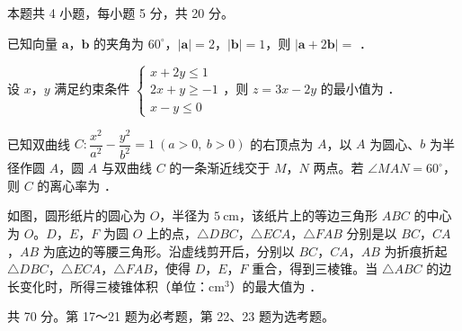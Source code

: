 \begin{gktip}
本题共 4 小题，每小题 5 分，共 20 分。
\end{gktip}

\begin{question}
已知向量 $\boldsymbol a$，$\boldsymbol b$ 的夹角为 $60^\circ$，$|\boldsymbol a|=2$，$|\boldsymbol b|=1$，则 $|\boldsymbol a+2\boldsymbol b|=$ \gkblank{}．

\end{question}
\begin{question}
设 $x$，$y$ 满足约束条件 $\begin{cases}x+2y\le1\\ 2x+y\ge-1\\ x-y\le0\end{cases}$，则 $z=3x-2y$ 的最小值为 \gkblank{}．

\end{question}
\begin{question}
已知双曲线 $C:\dfrac{x^{2}}{a^{2}}-\dfrac{y^{2}}{b^{2}}=1\ (a>0,\ b>0)$ 的右顶点为 $A$，以 $A$ 为圆心、$b$ 为半径作圆 $A$，圆 $A$ 与双曲线 $C$ 的一条渐近线交于 $M$，$N$ 两点。若 $\angle MAN=60^\circ$，则 $C$ 的离心率为 \gkblank{}．

\Needspace{0.4\textheight}
\end{question}
\begin{question}
如图，圆形纸片的圆心为 $O$，半径为 $5\ \mathrm{cm}$，该纸片上的等边三角形 $ABC$ 的中心为 $O$。$D$，$E$，$F$ 为圆 $O$ 上的点，$\triangle DBC$，$\triangle ECA$，$\triangle FAB$ 分别是以 $BC$，$CA$，$AB$ 为底边的等腰三角形。沿虚线剪开后，分别以 $BC$，$CA$，$AB$ 为折痕折起 $\triangle DBC$，$\triangle ECA$，$\triangle FAB$，使得 $D$，$E$，$F$ 重合，得到三棱锥。当 $\triangle ABC$ 的边长变化时，所得三棱锥体积（单位：$\mathrm{cm}^{3}$）的最大值为 \gkblank{}．
\nopagebreak[4]
\begin{center}\end{center}
\nopagebreak[4]
\par\medskip

\end{question}

\begin{gktip}
共 70 分。第 17～21 题为必考题，第 22、23 题为选考题。
\end{gktip}


